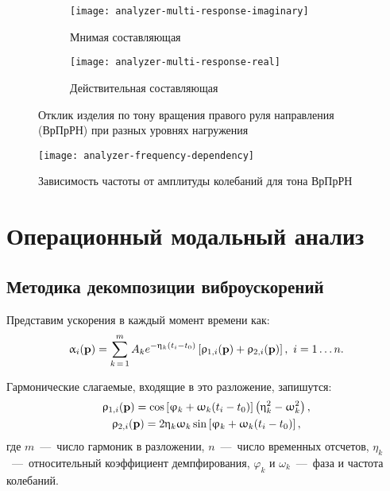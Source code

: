 \begin{figure}[H]
	\centering
	\begin{subfigure}{0.49\textwidth}
		\texttt{[image: analyzer-multi-response-imaginary]}
		\caption{Мнимая составляющая}
	\end{subfigure}
	\hfill
	\begin{subfigure}{0.49\textwidth}
		\texttt{[image: analyzer-multi-response-real]}
		\caption{Действительная составляющая}
	\end{subfigure}
     \caption{Отклик изделия по тону вращения правого руля направления (ВрПрРН) при разных уровнях нагружения} \label{fig:analyzer-multi-response}
\end{figure}

\begin{figure}[H]
	\centerfloat
	\texttt{[image: analyzer-frequency-dependency]}
	\caption{Зависимость частоты от амплитуды колебаний для тона ВрПрРН} \label{fig:analyzer-frequency-dependency}
\end{figure}

\section{Операционный модальный анализ}

\subsection{Методика декомпозиции виброускорений}


Представим ускорения в каждый момент времени как:
\begin{equation}
	\upalpha_i(\mathbf{p}) = \sum\limits_{k\,=\,1} ^ m A_k e ^ {-\upeta_k (t_i - t_0)} \left[ \uprho_{1,i}(\mathbf{p}) + \uprho_{2, i}(\mathbf{p}) \right], \ i = 1 \hdots n.
\end{equation}

Гармонические слагаемые, входящие в это разложение, запишутся:
\begin{equation}
	\begin{gathered}
		\uprho_{1, i}(\mathbf{p}) = \cos \left[ \upvarphi_k + \upomega_k (t_i - t_0) \right] \left( \upeta_k ^ 2 - \upomega_k ^ 2 \right), \\
		\uprho_{2, i}(\mathbf{p}) = 2 \upeta_k \upomega_k \sin \left[ \upvarphi_k + \upomega_k (t_i - t_0) \right],
	\end{gathered}
\end{equation}
где $ m $~---~число гармоник в разложении, $ n $~---~число временных отсчетов, $ \eta_k $~---~относительный коэффициент демпфирования, $ \varphi_k $ и $ \omega_k $~---~фаза и частота колебаний. 

